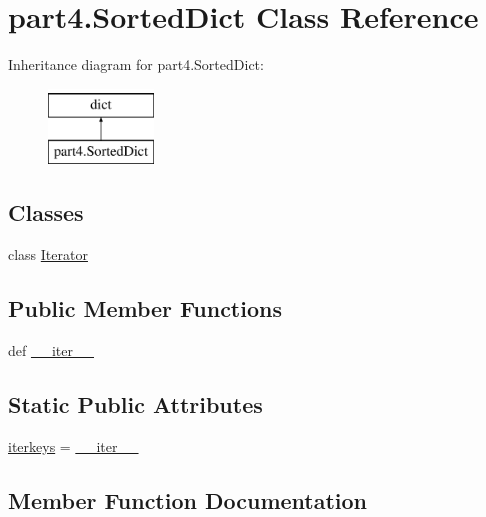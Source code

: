 \hypertarget{classpart4_1_1SortedDict}{}\section{part4.\+Sorted\+Dict Class Reference}
\label{classpart4_1_1SortedDict}
Inheritance diagram for part4.\+Sorted\+Dict\+:\begin{figure}[H]
\begin{center}
\leavevmode
\includegraphics[height=2.000000cm]{classpart4_1_1SortedDict}
\end{center}
\end{figure}
\subsection*{Classes}
\begin{DoxyCompactItemize}
\item 
class \hyperlink{classpart4_1_1SortedDict_1_1Iterator}{Iterator}
\end{DoxyCompactItemize}
\subsection*{Public Member Functions}
\begin{DoxyCompactItemize}
\item 
def \hyperlink{classpart4_1_1SortedDict_ad90d06163d5808f4a271ea66065df3c6}{\+\_\+\+\_\+iter\+\_\+\+\_\+}
\end{DoxyCompactItemize}
\subsection*{Static Public Attributes}
\begin{DoxyCompactItemize}
\item 
\hyperlink{classpart4_1_1SortedDict_afaad66c550eaf1356fc48361c32c2b72}{iterkeys} = \hyperlink{classpart4_1_1SortedDict_ad90d06163d5808f4a271ea66065df3c6}{\+\_\+\+\_\+iter\+\_\+\+\_\+}
\end{DoxyCompactItemize}


\subsection{Member Function Documentation}
\hypertarget{classpart4_1_1SortedDict_ad90d06163d5808f4a271ea66065df3c6}{}
